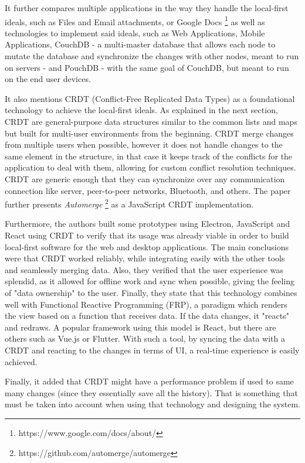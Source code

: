 It further compares multiple applications in the way they handle the local-first ideals, such as Files and Email attachments, or Google Docs \footnote{https://www.google.com/docs/about/} as well as technologies to implement said ideals, such as Web Applications, Mobile Applications, CouchDB \cite{couchdb} - a multi-master database that allows each node to mutate the database and synchronize the changes with other nodes, meant to run on servers - and PouchDB \cite{pouchdb} - with the same goal of CouchDB, but meant to run on the end user devices.

It also mentions CRDT (Conflict-Free Replicated Data Types) as a foundational technology to achieve the local-first ideals. As explained in the next section,  CRDT are general-purpose data structures similar to the common lists and maps but built for multi-user environments from the beginning. CRDT merge changes from multiple users when possible, however it does not handle changes to the same element in the structure, in that case it keeps track of the conflicts for the application to deal with them, allowing for custom conflict resolution techniques. CRDT are generic enough that they can synchronize over any communication connection like server, peer-to-peer networks, Bluetooth, and others. The paper further presents \textit{Automerge} \footnote{https://github.com/automerge/automerge} as a JavaScript CRDT implementation.

Furthermore, the authors built some prototypes using Electron, JavaScript and React using CRDT to verify that its usage was already viable in order to build local-first software for the web and desktop applications. The main conclusions were that CRDT worked reliably, while integrating easily with the other tools and seamlessly merging data. Also, they verified that the user experience was splendid, as it allowed for offline work and sync when possible, giving the feeling of "data ownership" to the user. Finally, they state that this technology combines well with Functional Reactive Programming (FRP), a paradigm which renders the view based on a function that receives data. If the data changes, it "reacts" and redraws. A popular framework using this model is React, but there are others such as Vue.js or Flutter. With such a tool, by syncing the data with a CRDT and reacting to the changes in terms of UI, a real-time experience is easily achieved.

Finally, it added that CRDT might have a performance problem if used to same many changes (since they essentially save all the history). That is something that must be taken into account when using that technology and designing the system.


